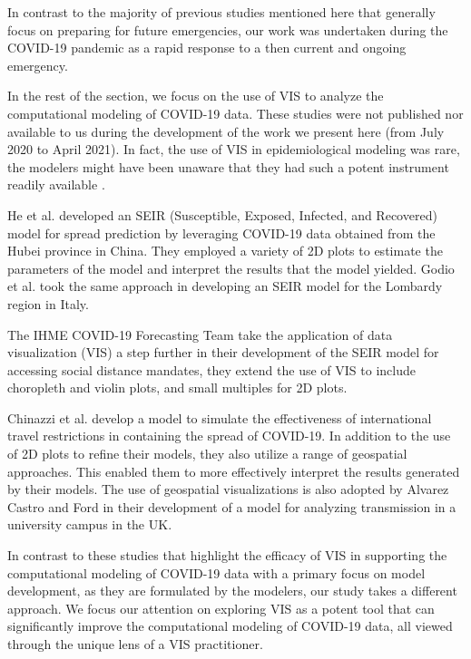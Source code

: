 In contrast to the majority of previous studies mentioned here that generally focus on preparing for future emergencies, our work was undertaken during the COVID-19 pandemic as a rapid response to a then current and ongoing emergency.


In the rest of the section, we focus on the use of \ac{VIS} to analyze the computational modeling of COVID-19 data.
These studies were not published nor available to us during the development of the work we present here (from July 2020 to April 2021).
In fact, the use of VIS in epidemiological modeling was rare, the modelers might have been unaware that they had such a potent instrument readily available \cite{chen2022RAMPVIS}.

He et al. \cite{he2020SEIR} developed an SEIR (Susceptible, Exposed, Infected, and Recovered) model for spread prediction by leveraging COVID-19 data obtained from the Hubei province in China.
They employed a variety of 2D plots to estimate the parameters of the model and interpret the results that the model yielded. Godio et al. \cite{godio2020SEIR} took the same approach in developing an SEIR model for the Lombardy region in Italy.

The IHME COVID-19 Forecasting Team \cite{ihmecovid-19forecastingteam2021Modeling} take the application of data visualization (VIS) a step further in their development of the SEIR model for accessing social distance mandates, they extend the use of \ac{VIS} to include choropleth and violin plots, and small multiples for 2D plots.

Chinazzi et al. \cite{chinazzi2020Effect} develop a model to simulate the effectiveness of international travel restrictions in containing the spread of COVID-19.
In addition to the use of 2D plots to refine their models, they also utilize a range of geospatial approaches.
This enabled them to more effectively interpret the results generated by their models.
The use of geospatial visualizations is also adopted by Alvarez Castro and Ford \cite{alvarezcastro20213D} in their development of a model for analyzing transmission in a university campus in the UK.

In contrast to these studies that highlight the efficacy of \ac{VIS} in supporting the computational modeling of COVID-19 data with a primary focus on model development, as they are formulated by the modelers, our study takes a different approach.
We focus our attention on exploring \ac{VIS} as a potent tool that can significantly improve the computational modeling of COVID-19 data, all viewed through the unique lens of a \ac{VIS} practitioner.
